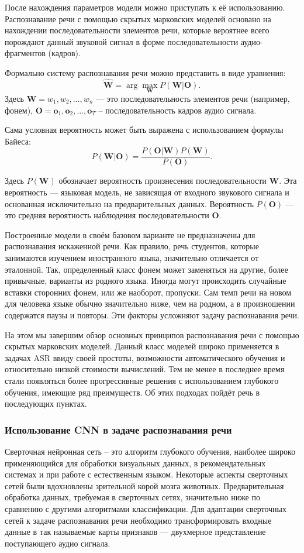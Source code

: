 После нахождения параметров модели можно приступать к её использованию. Распознавание речи с помощью скрытых марковских моделей основано на нахождении последовательности элементов речи, которые вероятнее всего порождают данный звуковой сигнал в форме последовательности аудио-фрагментов (кадров).

Формально систему распознавания речи можно представить в виде уравнения:
$$\mathbf{\hat{W}} = \operatorname{arg} \max_\mathbf{W} P(\mathbf{W} | \mathbf{O}).$$
Здесь $\mathbf{W} = w_1, w_2, \dots, w_n$ --- это последовательность элементов речи (например, фонем), $\mathbf{O} = \mathbf{o}_1, \mathbf{o}_2, \dots, \mathbf{o}_T$ -- последовательность кадров аудио сигнала.

Сама условная вероятность может быть выражена с использованием формулы Байеса:
$$P(\mathbf{W}|\mathbf{O}) = \frac{P(\mathbf{O}|\mathbf{W})P(\mathbf{W})}{P(\mathbf{O})}.$$

Здесь $P(\mathbf{W})$ обозначает вероятность произнесения последовательности $\mathbf{W}$. Эта вероятность --- языковая модель, не зависящая от входного звукового сигнала и основанная исключительно на предварительных данных. Вероятность $P(\mathbf{O})$ --- это средняя вероятность наблюдения последовательности $\mathbf{O}$.

Построенные модели в своём базовом варианте не предназначены для распознавания искаженной речи. Как правило, речь студентов, которые занимаются изучением иностранного языка, значительно отличается от эталонной. Так, определенный класс фонем может заменяться на другие, более привычные, варианты из родного языка. Иногда могут происходить случайные вставки сторонних фонем, или же наоборот, пропуски. Сам темп речи на новом для человека языке обычно значительно ниже, чем на родном, а в произношении содержатся паузы и повторы. Эти факторы усложняют задачу распознавания речи.

На этом мы завершим обзор основных принципов распознавания речи с помощью скрытых марковских моделей. Данный класс моделей широко применяется в задачах ASR ввиду своей простоты, возможности автоматического обучения и относительно низкой стоимости вычислений. Тем не менее в последнее время стали появляться более прогрессивные решения с использованием глубокого обучения, имеющие ряд преимуществ. Об этих подходах пойдёт речь в последующих пунктах.

\subsubsection{Использование CNN в задаче распознавания речи}
Сверточная нейронная сеть -- это алгоритм глубокого обучения, наиболее широко применяющийся для обработки визуальных данных, в рекомендательных системах\cite{cnn-recomendation-system} и при работе с естественным языком\cite{cnn-nlp}. Некоторые аспекты сверточных сетей были вдохновлены зрительной корой мозга животных\cite{cnn-neocognitron}. Предварительная обработка данных, требуемая в сверточных сетях, значительно ниже по сравнению с другими алгоритмами классификации. Для адаптации сверточных сетей к задаче распознавания речи необходимо трансформировать входные данные в так называемые карты признаков --- двухмерное представление поступающего аудио сигнала.


